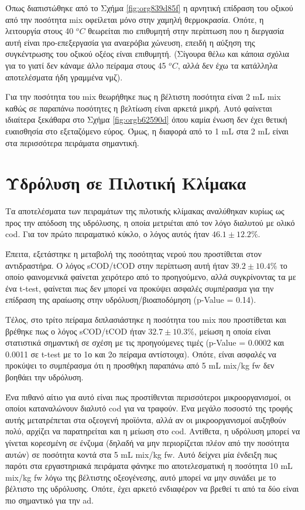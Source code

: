 \documentclass[11pt]{report}
\begin{document}
Όπως διαπιστώθηκε από το Σχήμα \ref{fig:org839d85f} η αρνητική επίδραση του οξικού από την ποσότητα \acrshort{mix} οφείλεται μόνο στην χαμηλή θερμοκρασία. Οπότε, η λειτουργία στους 40 \(^oC\) θεωρείται πιο επιθυμητή στην περίπτωση που η διεργασία αυτή είναι προ-επεξεργασία για αναερόβια χώνευση, επειδή η αύξηση της συγκέντρωσης του οξικού οξέος είναι επιθυμητή. (Σίγουρα θέλω και κάποια σχόλια για το γιατί δεν κάναμε άλλο πείραμα στους 45 \(^oC\), αλλά δεν έχω τα κατάλληλα αποτελέσματα ήδη γραμμένα νμζ).

Για την ποσότητα του \acrshort{mix} θεωρήθηκε πως η βέλτιστη ποσότητα είναι 2 mL \acrshort{mix} καθώς σε παραπάνω ποσότητες η βελτίωση είναι αρκετά μικρή. Αυτό φαίνεται ιδιαίτερα ξεκάθαρα στο Σχήμα \ref{fig:orgb62590d} όπου καμία ένωση δεν έχει θετική ευαισθησία στο εξεταζόμενο εύρος. Όμως, η διαφορά από το 1 mL στα 2 mL είναι στα περισσότερα πειράματα σημαντική.

\section{Υδρόλυση σε Πιλοτική Κλίμακα}
\label{sec:orgd9103c4}
Τα αποτελέσματα των πειραμάτων της πιλοτικής κλίμακας αναλύθηκαν κυρίως ως προς την απόδοση της υδρόλυσης, η οποία μετριέται από τον λόγο διαλυτού με ολικό \acrshort{cod}. Για τον πρώτο πειραματικό κύκλο, ο λόγος αυτός ήταν \(46.1 \pm 12.2 \%\).

Έπειτα, εξετάστηκε η μεταβολή της ποσότητας νερού που προστίθεται στον αντιδραστήρα. Ο λόγος sCOD/tCOD στην περίπτωση αυτή ήταν \(39.2 \pm 10.4 \%\) το οποίο φαινομενικά φαίνεται χειρότερο από το προηγούμενο, αλλά συγκρίνοντας τα με ένα t-test, φαίνεται πως δεν μπορεί να προκύψει ασφαλές συμπέρασμα για την επίδραση της αραίωσης στην υδρόλυση/βιοαποδόμηση (p-Value = 0.14). 

Τέλος, στο τρίτο πείραμα διπλασιάστηκε η ποσότητα του \acrshort{mix} που προστίθεται και βρέθηκε πως ο λόγος sCOD/tCOD ήταν \(32.7 \pm 10.3 \%\), μείωση η οποία είναι στατιστικά σημαντική σε σχέση με τις προηγούμενες τιμές (p-Value = 0.0002 και 0.0011 σε t-test με το 1ο και 2ο πείραμα αντίστοιχα). Οπότε, είναι ασφαλές να προκύψει το συμπέρασμα ότι η προσθήκη παραπάνω από 5 mL \acrshort{mix}/kg \acrshort{fw} δεν βοηθάει την υδρόλυση.

Ένα πιθανό αίτιο για αυτό είναι πως προστίθενται περισσότεροι μικροοργανισμοί, οι οποίοι καταναλώνουν διαλυτό \acrshort{cod} για να τραφούν. Ένα μεγάλο ποσοστό της τροφής αυτής μετατρέπεται στα οξεογενή προϊόντα, αλλά αν οι μικροοργανισμοί αυξηθούν πολύ, αρχίζει να παρατηρείται και η μείωση στο \acrshort{cod}. Αντίθετα, η υδρόλυση μπορεί να γίνεται κορεσμένη σε ένζυμα (δηλαδή να μην περιορίζεται πλέον από την ποσότητα αυτών) σε ποσότητα κοντά στα 5 mL \acrshort{mix}/kg \acrshort{fw}. Αυτό δείχνει μία ένδειξη πως παρότι στα εργαστηριακά πειράματα φάνηκε πιο αποτελεσματική η ποσότητα 10 mL \acrshort{mix}/kg \acrshort{fw} λόγω της βέλτιστης οξεογένεσης, αυτό μπορεί να μην συνάδει με το βέλτιστο της υδρόλυσης. Οπότε, έχει αρκετό ενδιαφέρον να βρεθεί τι από τα δύο είναι πιο σημαντικό για την \acrshort{ad}.
\end{document}
